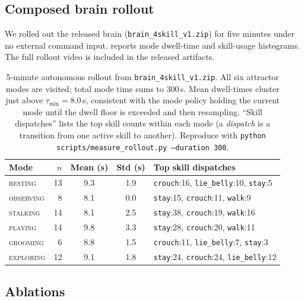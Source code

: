 \documentclass[11pt]{article}
\begin{document}
\subsection{Composed brain rollout}

We rolled out the released brain (\texttt{brain\_4skill\_v1.zip}) for five
minutes under no external command input.
 reports mode dwell-time and skill-usage histograms.
The full rollout video is included in the released artifacts.

\begin{table}[h]
  \centering\small
  \caption{5-minute autonomous rollout from
  \texttt{brain\_4skill\_v1.zip}. All six attractor modes are visited; total
  mode time sums to 300\,s. Mean dwell-times cluster just above
  $\tau_{\min} = 8.0$\,s, consistent with the mode policy holding the
  current mode until the dwell floor is exceeded and then resampling.
  ``Skill dispatches'' lists the top skill counts within each mode (a
  \emph{dispatch} is a transition from one active skill to another).
  Reproduce with
  \texttt{python scripts/measure\_rollout.py --duration 300}.}
  \label{tab:rollout}
  \begin{tabular}{lrccl}
    \toprule
    Mode        & $n$ & Mean (s) & Std (s) & Top skill dispatches \\
    \midrule
    \textsc{resting}   & 13 & 9.3 & 1.9 & \texttt{crouch}:16, \texttt{lie\_belly}:10, \texttt{stay}:5 \\
    \textsc{observing} &  8 & 8.1 & 0.0 & \texttt{stay}:15, \texttt{crouch}:11, \texttt{walk}:9 \\
    \textsc{stalking}  & 14 & 8.1 & 2.5 & \texttt{stay}:38, \texttt{crouch}:19, \texttt{walk}:16 \\
    \textsc{playing}   & 14 & 9.8 & 3.3 & \texttt{stay}:28, \texttt{crouch}:20, \texttt{walk}:11 \\
    \textsc{grooming}  &  6 & 8.8 & 1.5 & \texttt{crouch}:11, \texttt{lie\_belly}:7, \texttt{stay}:3 \\
    \textsc{exploring} & 12 & 9.1 & 1.8 & \texttt{stay}:24, \texttt{crouch}:24, \texttt{lie\_belly}:12 \\
    \bottomrule
  \end{tabular}
\end{table}

\subsection{Ablations}
\end{document}
